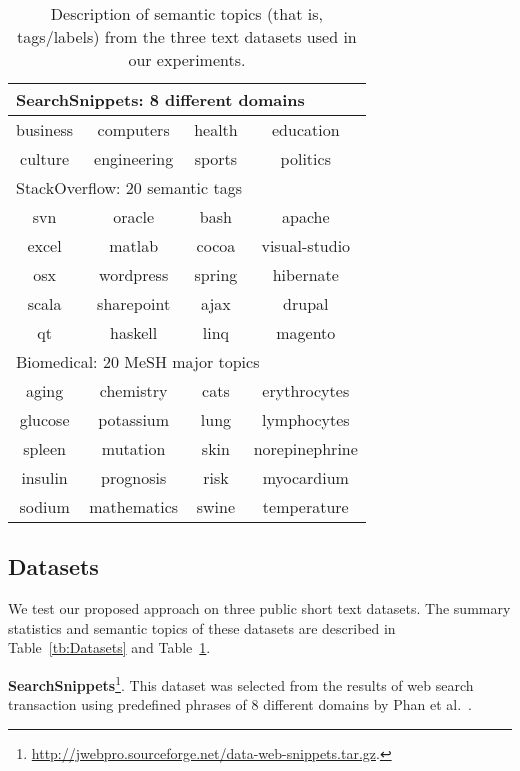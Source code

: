 \documentclass[review]{elsarticle}
\begin{document}
\begin{table}[t] \begin{center}
\begin{tabular}{|c|c|c|c|}\hline
\multicolumn{4}{|l|}{SearchSnippets: 8 different domains}\\\hline
 business & computers & health & education  \\\hline
culture  & engineering& sports& politics  \\\hline\hline

\multicolumn{4}{|l|}{StackOverflow: 20 semantic tags}\\\hline
 svn & oracle & bash & apache  \\\hline
excel & matlab& cocoa& visual-studio  \\\hline
 osx & wordpress& spring &hibernate \\\hline
 scala & sharepoint & ajax & drupal \\\hline
qt  & haskell  & linq & magento \\\hline\hline

\multicolumn{4}{|l|}{Biomedical: 20 MeSH major topics}\\\hline
 aging & chemistry& cats  & erythrocytes  \\\hline
glucose & potassium& lung & lymphocytes  \\\hline
spleen & mutation&skin  &norepinephrine \\\hline
insulin & prognosis & risk & myocardium \\\hline
sodium  &  mathematics & swine & temperature \\\hline
\end{tabular}
\end{center}
\caption{\label{tb:SemanticTopics} Description of semantic topics (that is, tags/labels) from the three text datasets used in our experiments.}
\end{table}

\subsection{Datasets}
We test our proposed approach on three public short text datasets. The summary statistics and semantic topics of these datasets are described in Table~\ref{tb:Datasets} and Table~\ref{tb:SemanticTopics}.

{\bf{SearchSnippets}}\footnote{\url{http://jwebpro.sourceforge.net/data-web-snippets.tar.gz}.}. This dataset was selected from the results of web search transaction using predefined phrases of 8 different domains by Phan et al.~\cite{20_phan2008learning}.
\end{document}
